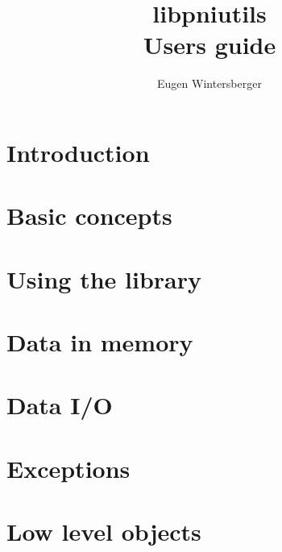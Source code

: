 \documentclass[a4paper,twoside]{book}
\author{Eugen Wintersberger}
\title{{\Huge libpniutils\\ Users guide}}
\begin{document}
\maketitle
\tableofcontents

\chapter{Introduction}\label{chapter:introduction}


\chapter{Basic concepts}\label{chapter:basics}


\chapter{Using the library}\label{chapter:usage}


\chapter{Data in memory}\label{chapter:data_in_memory}


\chapter{Data I/O}\label{chapter:io}

\chapter{Exceptions}\label{chapter:exceptions}

\appendix
\chapter{Low level objects}

\end{document}

